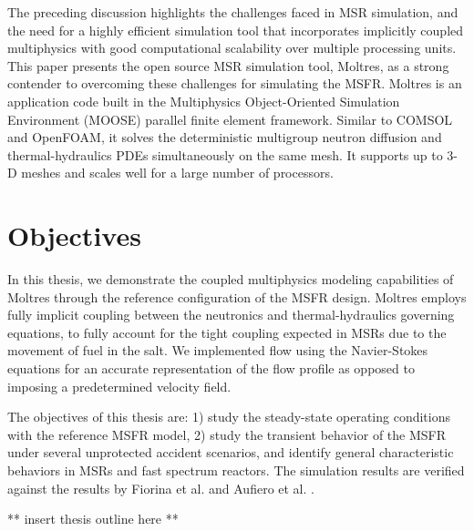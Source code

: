 The preceding discussion highlights the challenges faced in MSR simulation,
and the need for a highly efficient simulation tool that incorporates
implicitly coupled multiphysics with good computational scalability over
multiple processing units. This paper presents the open source MSR simulation
tool, Moltres, as a strong contender to overcoming these challenges for
simulating the MSFR. Moltres is an application code
built in the Multiphysics Object-Oriented Simulation Environment (MOOSE)
parallel finite element framework. Similar to COMSOL and OpenFOAM, it solves
the deterministic multigroup neutron diffusion and thermal-hydraulics
\glspl{PDE} simultaneously on the same mesh. It supports up to 3-D meshes and
scales well for a large number of processors.

\section{Objectives}

In this thesis, we demonstrate the coupled multiphysics modeling capabilities
of Moltres through the reference configuration of the MSFR design. Moltres
employs fully implicit coupling between the neutronics and thermal-hydraulics
governing equations, to fully account for the tight coupling expected in MSRs
due to the movement of fuel in the salt. We implemented flow using the
Navier-Stokes equations for an accurate representation of the flow profile as
opposed to imposing a predetermined velocity field.

The objectives of this thesis are: 1) study the steady-state operating
conditions with the reference \gls{MSFR} model, 2) study the transient
behavior of the \gls{MSFR} under several unprotected accident scenarios, and
identify general characteristic behaviors in MSRs and fast spectrum reactors.
The simulation results are verified against the results by Fiorina et al.
\cite{fiorina_modelling_2014} and Aufiero et al.
\cite{aufiero_development_2014}.

** insert thesis outline here **